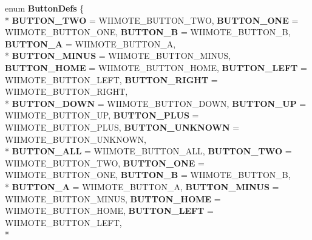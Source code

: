 \begin{DoxyCompactItemize}
\item 
enum {\bfseries Button\-Defs} \{ \\*
{\bfseries B\-U\-T\-T\-O\-N\-\_\-\-T\-W\-O} =  W\-I\-I\-M\-O\-T\-E\-\_\-\-B\-U\-T\-T\-O\-N\-\_\-\-T\-W\-O, 
{\bfseries B\-U\-T\-T\-O\-N\-\_\-\-O\-N\-E} =  W\-I\-I\-M\-O\-T\-E\-\_\-\-B\-U\-T\-T\-O\-N\-\_\-\-O\-N\-E, 
{\bfseries B\-U\-T\-T\-O\-N\-\_\-\-B} =  W\-I\-I\-M\-O\-T\-E\-\_\-\-B\-U\-T\-T\-O\-N\-\_\-\-B, 
{\bfseries B\-U\-T\-T\-O\-N\-\_\-\-A} =  W\-I\-I\-M\-O\-T\-E\-\_\-\-B\-U\-T\-T\-O\-N\-\_\-\-A, 
\\*
{\bfseries B\-U\-T\-T\-O\-N\-\_\-\-M\-I\-N\-U\-S} =  W\-I\-I\-M\-O\-T\-E\-\_\-\-B\-U\-T\-T\-O\-N\-\_\-\-M\-I\-N\-U\-S, 
{\bfseries B\-U\-T\-T\-O\-N\-\_\-\-H\-O\-M\-E} =  W\-I\-I\-M\-O\-T\-E\-\_\-\-B\-U\-T\-T\-O\-N\-\_\-\-H\-O\-M\-E, 
{\bfseries B\-U\-T\-T\-O\-N\-\_\-\-L\-E\-F\-T} =  W\-I\-I\-M\-O\-T\-E\-\_\-\-B\-U\-T\-T\-O\-N\-\_\-\-L\-E\-F\-T, 
{\bfseries B\-U\-T\-T\-O\-N\-\_\-\-R\-I\-G\-H\-T} =  W\-I\-I\-M\-O\-T\-E\-\_\-\-B\-U\-T\-T\-O\-N\-\_\-\-R\-I\-G\-H\-T, 
\\*
{\bfseries B\-U\-T\-T\-O\-N\-\_\-\-D\-O\-W\-N} =  W\-I\-I\-M\-O\-T\-E\-\_\-\-B\-U\-T\-T\-O\-N\-\_\-\-D\-O\-W\-N, 
{\bfseries B\-U\-T\-T\-O\-N\-\_\-\-U\-P} =  W\-I\-I\-M\-O\-T\-E\-\_\-\-B\-U\-T\-T\-O\-N\-\_\-\-U\-P, 
{\bfseries B\-U\-T\-T\-O\-N\-\_\-\-P\-L\-U\-S} =  W\-I\-I\-M\-O\-T\-E\-\_\-\-B\-U\-T\-T\-O\-N\-\_\-\-P\-L\-U\-S, 
{\bfseries B\-U\-T\-T\-O\-N\-\_\-\-U\-N\-K\-N\-O\-W\-N} =  W\-I\-I\-M\-O\-T\-E\-\_\-\-B\-U\-T\-T\-O\-N\-\_\-\-U\-N\-K\-N\-O\-W\-N, 
\\*
{\bfseries B\-U\-T\-T\-O\-N\-\_\-\-A\-L\-L} =  W\-I\-I\-M\-O\-T\-E\-\_\-\-B\-U\-T\-T\-O\-N\-\_\-\-A\-L\-L, 
{\bfseries B\-U\-T\-T\-O\-N\-\_\-\-T\-W\-O} =  W\-I\-I\-M\-O\-T\-E\-\_\-\-B\-U\-T\-T\-O\-N\-\_\-\-T\-W\-O, 
{\bfseries B\-U\-T\-T\-O\-N\-\_\-\-O\-N\-E} =  W\-I\-I\-M\-O\-T\-E\-\_\-\-B\-U\-T\-T\-O\-N\-\_\-\-O\-N\-E, 
{\bfseries B\-U\-T\-T\-O\-N\-\_\-\-B} =  W\-I\-I\-M\-O\-T\-E\-\_\-\-B\-U\-T\-T\-O\-N\-\_\-\-B, 
\\*
{\bfseries B\-U\-T\-T\-O\-N\-\_\-\-A} =  W\-I\-I\-M\-O\-T\-E\-\_\-\-B\-U\-T\-T\-O\-N\-\_\-\-A, 
{\bfseries B\-U\-T\-T\-O\-N\-\_\-\-M\-I\-N\-U\-S} =  W\-I\-I\-M\-O\-T\-E\-\_\-\-B\-U\-T\-T\-O\-N\-\_\-\-M\-I\-N\-U\-S, 
{\bfseries B\-U\-T\-T\-O\-N\-\_\-\-H\-O\-M\-E} =  W\-I\-I\-M\-O\-T\-E\-\_\-\-B\-U\-T\-T\-O\-N\-\_\-\-H\-O\-M\-E, 
{\bfseries B\-U\-T\-T\-O\-N\-\_\-\-L\-E\-F\-T} =  W\-I\-I\-M\-O\-T\-E\-\_\-\-B\-U\-T\-T\-O\-N\-\_\-\-L\-E\-F\-T, 
\\*

\end{DoxyCompactItemize}
